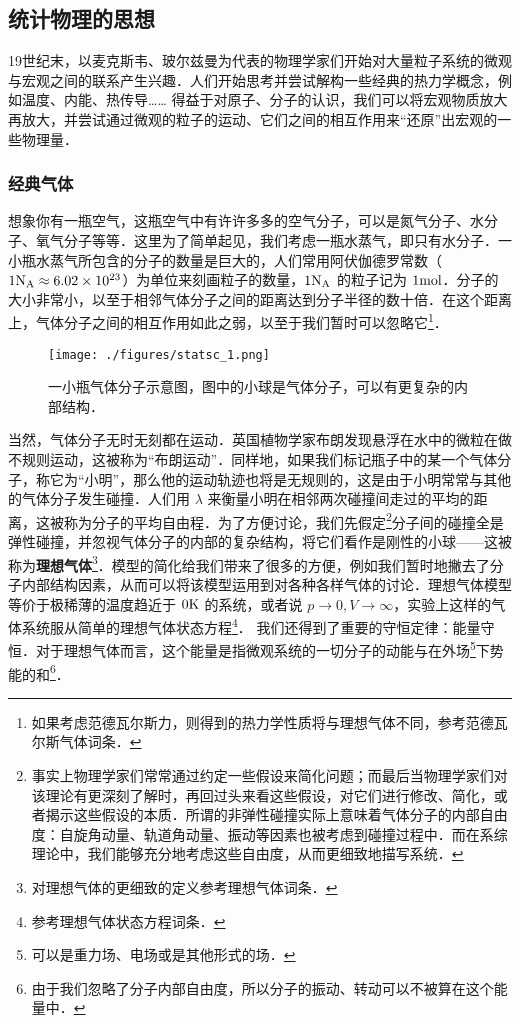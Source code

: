 \subsection{统计物理的思想}
19世纪末，以麦克斯韦、玻尔兹曼为代表的物理学家们开始对大量粒子系统的微观与宏观之间的联系产生兴趣．人们开始思考并尝试解构一些经典的热力学概念，例如温度、内能、热传导…… 得益于对原子、分子的认识，我们可以将宏观物质放大再放大，并尝试通过微观的粒子的运动、它们之间的相互作用来“还原”出宏观的一些物理量．
\subsubsection{经典气体}
想象你有一瓶空气，这瓶空气中有许许多多的空气分子，可以是氮气分子、水分子、氧气分子等等．这里为了简单起见，我们考虑一瓶水蒸气，即只有水分子．一小瓶水蒸气所包含的分子的数量是巨大的，人们常用阿伏伽德罗常数（$1 {\rm N_A}\approx 6.02\times 10^{23}$）为单位来刻画粒子的数量，$1 {\rm N_A}$ 的粒子记为 $1 {\rm mol}$．分子的大小非常小，以至于相邻气体分子之间的距离达到分子半径的数十倍．在这个距离上，气体分子之间的相互作用如此之弱，以至于我们暂时可以忽略它\footnote{如果考虑范德瓦尔斯力，则得到的热力学性质将与理想气体不同，参考范德瓦尔斯气体词条．}．

\begin{figure}[ht]
\centering
\texttt{[image: ./figures/statsc\_1.png]}
\caption{一小瓶气体分子示意图，图中的小球是气体分子，可以有更复杂的内部结构．} \label{statsc_fig1}
\end{figure}
当然，气体分子无时无刻都在运动．英国植物学家布朗发现悬浮在水中的微粒在做不规则运动，这被称为“布朗运动”．同样地，如果我们标记瓶子中的某一个气体分子，称它为“小明”，那么他的运动轨迹也将是无规则的，这是由于小明常常与其他的气体分子发生碰撞．人们用 $\lambda$ 来衡量小明在相邻两次碰撞间走过的平均的距离，这被称为分子的平均自由程．为了方便讨论，我们先假定\footnote{事实上物理学家们常常通过约定一些假设来简化问题；而最后当物理学家们对该理论有更深刻了解时，再回过头来看这些假设，对它们进行修改、简化，或者揭示这些假设的本质．所谓的非弹性碰撞实际上意味着气体分子的内部自由度：自旋角动量、轨道角动量、振动等因素也被考虑到碰撞过程中．而在系综理论中，我们能够充分地考虑这些自由度，从而更细致地描写系统．}分子间的碰撞全是弹性碰撞，并忽视气体分子的内部的复杂结构，将它们看作是刚性的小球——这被称为\textbf{理想气体}\footnote{对理想气体的更细致的定义参考理想气体词条．}．模型的简化给我们带来了很多的方便，例如我们暂时地撇去了分子内部结构因素，从而可以将该模型运用到对各种各样气体的讨论．理想气体模型等价于极稀薄的温度趋近于 $0 \rm K$ 的系统，或者说 $p\rightarrow 0,V\rightarrow \infty$，实验上这样的气体系统服从简单的理想气体状态方程\footnote{参考理想气体状态方程词条．}．
我们还得到了重要的守恒定律：能量守恒．对于理想气体而言，这个能量是指微观系统的一切分子的动能与在外场\footnote{可以是重力场、电场或是其他形式的场．}下势能的和\footnote{由于我们忽略了分子内部自由度，所以分子的振动、转动可以不被算在这个能量中．}．

